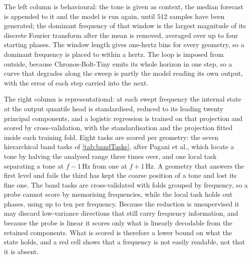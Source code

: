 The left column is behavioural: the tone is given as context, the median forecast is appended to it and the model is run again, until $512$ samples have been generated; the dominant frequency of that window is the largest magnitude of its discrete Fourier transform after the mean is removed, averaged over up to four starting phases. The window length gives one-hertz bins for every geometry, so a dominant frequency is placed to within a hertz. The loop is imposed from outside, because Chronos-Bolt-Tiny emits its whole horizon in one step, so a curve that degrades along the sweep is partly the model reading its own output, with the error of each step carried into the next.

The right column is representational: at each swept frequency the internal state at the output quantile head is standardised, reduced to its leading twenty principal components, and a logistic regression is trained on that projection and scored by cross-validation, with the standardisation and the projection fitted inside each training fold. Eight tasks are scored per geometry: the seven hierarchical band tasks of \autoref{tab:bandTasks}, after Pagani et al.\autocite{paganiPreliminaryInsightsChronos2026}, which locate a tone by halving the analysed range three times over, and one local task separating a tone at $f-1$\,Hz from one at $f+1$\,Hz. A geometry that answers the first level and fails the third has kept the coarse position of a tone and lost its fine one. The band tasks are cross-validated with folds grouped by frequency, so a probe cannot score by memorising frequencies, while the local task holds out phases, using up to ten per frequency. Because the reduction is unsupervised it may discard low-variance directions that still carry frequency information, and because the probe is linear it scores only what is linearly decodable from the retained components. What is scored is therefore a lower bound on what the state holds, and a red cell shows that a frequency is not easily readable, not that it is absent.





